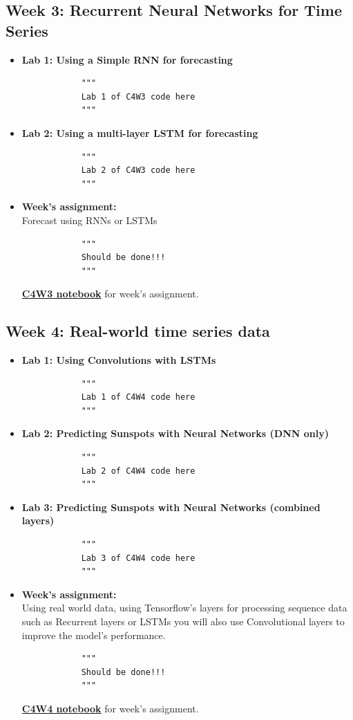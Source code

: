 \documentclass[20pt]{article}
\newcommand{\speciallink}[2]{\textbf{\textcolor{red}{\href{#1}{#2}}}}
\begin{document}
	\subsection{Week 3: Recurrent Neural Networks for Time Series}
	\begin{itemize}
		\item \textbf{Lab 1: Using a Simple RNN for forecasting}
		\begin{verbatim}
			"""
			Lab 1 of C4W3 code here
			"""
		\end{verbatim}
		\item \textbf{Lab 2: Using a multi-layer LSTM for forecasting}
		\begin{verbatim}
			"""
			Lab 2 of C4W3 code here
			"""
		\end{verbatim}
		\item \textbf{Week's assignment:}\\
		Forecast using RNNs or LSTMs
		\begin{verbatim}
			"""
			Should be done!!!
			"""
		\end{verbatim}
		\speciallink{https://drive.google.com/file/d/1PVYDPLobYhiSQvCLlvr\_\_akvsRclDYGH/view?usp=drive\_link}{C4W3 notebook} for week's assignment.
	\end{itemize}
	\subsection{Week 4: Real-world time series data}
	\begin{itemize}
		\item \textbf{Lab 1: Using Convolutions with LSTMs}
		\begin{verbatim}
			"""
			Lab 1 of C4W4 code here
			"""
		\end{verbatim}
		\item \textbf{Lab 2: Predicting Sunspots with Neural Networks (DNN only)}
		\begin{verbatim}
			"""
			Lab 2 of C4W4 code here
			"""
		\end{verbatim}
		\item \textbf{Lab 3: Predicting Sunspots with Neural Networks (combined layers)}
		\begin{verbatim}
			"""
			Lab 3 of C4W4 code here
			"""
		\end{verbatim}
		\item \textbf{Week's assignment:}\\
		Using real world data, using Tensorflow's layers for processing sequence data such as Recurrent layers or LSTMs you will also use Convolutional layers to improve the model's performance.
		\begin{verbatim}
			"""
			Should be done!!!
			"""
		\end{verbatim}
		\speciallink{https://drive.google.com/file/d/12EXkB7wgNFRVr0u6Xxty354503HDtgUc/view?usp=drive\_link}{C4W4 notebook} for week's assignment.
	\end{itemize}


\end{document}
